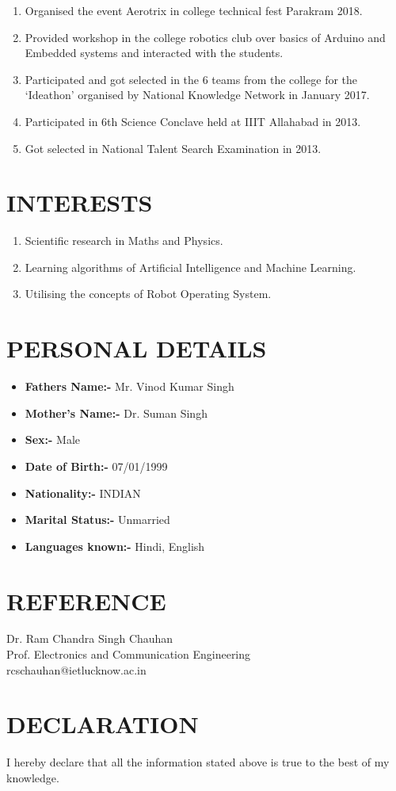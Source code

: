 \documentclass[margin,line]{res}
\begin{document}
\begin{resume}
\begin{enumerate}
\item Organised the event Aerotrix in college technical fest Parakram 2018.
\item Provided workshop in the college robotics club over basics of Arduino and Embedded systems and interacted with the students.
\item Participated and got selected in the 6 teams from the college for the ‘Ideathon’ organised by National Knowledge Network in January 2017.
\item Participated in 6th Science Conclave held at IIIT Allahabad in 2013.
\item Got selected in National Talent Search Examination in 2013.
\end{enumerate}\hfill
\section{\sc INTERESTS}
\begin{enumerate}
\item Scientific research in Maths and Physics.
\item Learning algorithms of Artificial Intelligence and Machine Learning.
\item Utilising the concepts of Robot Operating System.
\end{enumerate}
\section{\sc PERSONAL DETAILS}

\begin{itemize}
\item {\bf Fathers Name:-} Mr. Vinod Kumar Singh
\item {\bf Mother’s Name:-} Dr. Suman Singh
\item {\bf Sex:-} Male
\item {\bf Date of Birth:-} 07/01/1999
\item {\bf Nationality:-} INDIAN
\item {\bf Marital Status:-} Unmarried
\item {\bf Languages known:-} Hindi, English
\end{itemize}

\section{\sc REFERENCE} Dr. Ram Chandra Singh Chauhan\\
Prof. Electronics and Communication Engineering\\ rcschauhan@ietlucknow.ac.in

\section{\sc DECLARATION} I hereby declare that all the information stated above is true to the best of my knowledge.

\end{resume}
\end{document}
